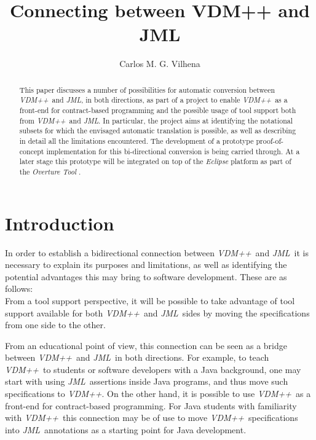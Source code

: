 \documentclass{llncs}
\newcommand{\jml}{\textit{JML}}
\newcommand{\vpp}{\textit{VDM++}}
\begin{document}
\title{
Connecting between VDM++ and JML
}

\author{Carlos M. G. Vilhena}


\maketitle

\begin{abstract}
This paper discusses a number of  possibilities for automatic conversion between \vpp\ and \jml, in both directions,
as part of a project to enable \vpp\  as a front-end for contract-based programming and the possible usage of tool support both from \vpp\ and \jml. In particular, the project aims at identifying  the notational subsets for which the envisaged automatic translation is possible, as well as describing in detail all the limitations encountered. The development of a prototype proof-of-concept implementation for this bi-directional conversion
is being carried through. At a later stage this prototype will be integrated on top of the \textit{Eclipse} \cite{eclipsebook} platform as part of the \textit{Overture Tool} \cite{overturetool}.
\end{abstract}

\section{Introduction}

In order to establish a bidirectional connection between \vpp\ and \jml\ it is necessary to explain its purposes and limitations, as well as identifying the potential  advantages this may bring to software development. These are as follows:\\
From a tool support perspective, it will be possible to take advantage of  tool support available for both \vpp\ and \jml\ sides by moving the specifications from one side to the other.

From an educational point of view,  this connection can be seen as a bridge between \vpp\ and \jml\ in both directions. For example, to teach \vpp\ to students or software developers with a Java background, one may start with  using \jml\ assertions inside Java programs, and thus move such  specifications to \vpp. 
On the other hand, it is possible to use \vpp\ as a front-end for contract-based programming. For Java students with familiarity with \vpp\  this connection may be of use to move \vpp\ specifications into \jml\ annotations as a starting point for Java development. 
\end{document}
